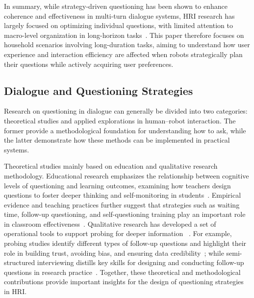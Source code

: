 \documentclass[sigconf,authordraft]{acmart}
\begin{document}
In summary, while strategy-driven questioning has been shown to enhance coherence and effectiveness in multi-turn dialogue systems, HRI research has largely focused on optimizing individual questions, with limited attention to macro-level organization in long-horizon tasks~\cite{hu2024designing}. This paper therefore focuses on household scenarios involving long-duration tasks, aiming to understand how user experience and interaction efficiency are affected when robots strategically plan their questions while actively acquiring user preferences.




\subsection{Dialogue and Questioning Strategies}
Research on questioning in dialogue can generally be divided into two categories: theoretical studies and applied explorations in human–robot interaction. The former provide a methodological foundation for understanding how to ask, while the latter demonstrate how these methods can be implemented in practical systems.

Theoretical studies mainly based on education and qualitative research methodology. Educational research emphasizes the relationship between cognitive levels of questioning and learning outcomes, examining how teachers design questions to foster deeper thinking and self-monitoring in students~\cite{redfield1981meta,tofade2013best}. Empirical evidence and teaching practices further suggest that strategies such as waiting time, follow-up questioning, and self-questioning training play an important role in classroom effectiveness~\cite{redfield1981meta,tofade2013best}. Qualitative research has developed a set of operational tools to support probing for deeper information ~\cite{robinson2023probing,balza2022effective,dejonckheere2019semistructured}. For example, probing studies identify different types of follow-up questions and highlight their role in building trust, avoiding bias, and ensuring data credibility~\cite{robinson2023probing}; while semi-structured interviewing distills key skills for designing and conducting follow-up questions in research practice~\cite{dejonckheere2019semistructured}. Together, these theoretical and methodological contributions provide important insights for the design of questioning strategies in HRI.
\end{document}
